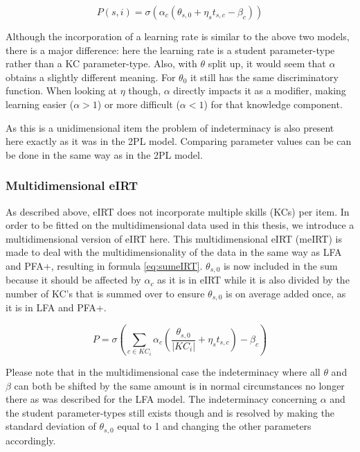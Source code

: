 \documentclass{scrartcl}
\begin{document}
\begin{equation}
\label{eq:eIRT}
P(s,i) = \sigma(\alpha_{c} (\theta_{s,0} + \eta_{s} t_{s,c} - \beta_{c}))
\end{equation}

Although the incorporation of a learning rate is similar to the above two models, there is a major difference: here the learning rate is a student parameter-type rather than a KC parameter-type. Also, with $\theta$ split up, it would seem that $\alpha$ obtains a slightly different meaning. For $\theta_{0}$ it still has the same discriminatory function. When looking at $\eta$ though, $\alpha$ directly impacts it as a modifier, making learning easier ($\alpha>1$) or more difficult ($\alpha<1$) for that knowledge component.

As this is a unidimensional item the problem of indeterminacy is also present here exactly as it was in the 2PL model. Comparing parameter values can be can be done in the same way as in the 2PL model.

\subsubsection{Multidimensional eIRT}
As described above, eIRT does not incorporate multiple skills (KCs) per item. In order to be fitted on the multidimensional data used in this thesis, we introduce a multidimensional version of eIRT here. This multidimensional eIRT (meIRT) is made to deal with the multidimensionality of the data in the same way as LFA and PFA+, resulting in formula \ref{eq:sumeIRT}. $\theta_{s,0}$ is now included in the sum because it should be affected by $\alpha_{c}$ as it is in eIRT while it is also divided by the number of KC's that is summed over to ensure $\theta_{s,0}$ is on average added once, as it is in LFA and PFA+.


\begin{equation}
\label{eq:sumeIRT}
P = \sigma(\sum_{c \in KC_{i}} \alpha_{c}(\frac{\theta_{s,0}}{|KC_{i}|} + \eta_{s} t_{s,c}) - \beta_{c})
\end{equation}

Please note that in the multidimensional case the indeterminacy where all $\theta$ and $\beta$ can both be shifted by the same amount is in normal circumstances no longer there as was described for the LFA model. The indeterminacy concerning $\alpha$ and the student parameter-types still exists though and is resolved by making the standard deviation of $\theta_{s,0}$ equal to 1 and changing the other parameters accordingly. 
\end{document}
